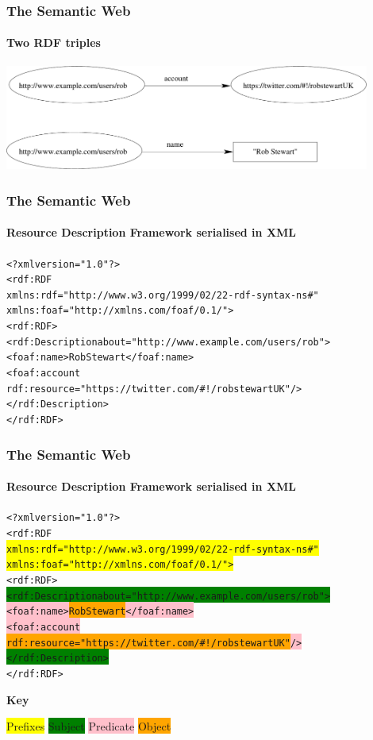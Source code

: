 \documentclass{beamer}
\newcommand{\hilightyellow}[1]{\colorbox{yellow}{#1}}
\newcommand{\hilightgreen}[1]{\colorbox{green}{#1}}
\newcommand{\hilightorange}[1]{\colorbox{orange}{#1}}
\newcommand{\hilightpink}[1]{\colorbox{pink}{#1}}
\begin{document}
\begin{frame}
\frametitle{The Semantic Web}
\framesubtitle{Two RDF triples}

\begin{center}
\includegraphics[width=120mm]{images/rdfexample.pdf}
\end{center}

\end{frame}




\begin{frame}[fragile]
\frametitle{The Semantic Web}
\framesubtitle{Resource Description Framework serialised in XML}

\small
\begin{alltt}
<?xml version="1.0"?>
<rdf:RDF
  xmlns:rdf="http://www.w3.org/1999/02/22-rdf-syntax-ns#"
  xmlns:foaf="http://xmlns.com/foaf/0.1/">
<rdf:RDF>
  <rdf:Description about="http://www.example.com/users/rob">
    <foaf:name>Rob Stewart</foaf:name>
    <foaf:account
       rdf:resource="https://twitter.com/#!/robstewartUK" />
  </rdf:Description>
</rdf:RDF>
\end{alltt}

\end{frame}

\begin{frame}[fragile]
\frametitle{The Semantic Web}
\framesubtitle{Resource Description Framework serialised in XML}

\small
\begin{alltt}
<?xml version="1.0"?>
<rdf:RDF
\hilightyellow{xmlns:rdf="http://www.w3.org/1999/02/22-rdf-syntax-ns#"}
\hilightyellow{xmlns:foaf="http://xmlns.com/foaf/0.1/">}
<rdf:RDF>
  \hilightgreen{<rdf:Description about="http://www.example.com/users/rob">}
    \hilightpink{<foaf:name>}\hilightorange{Rob Stewart}\hilightpink{</foaf:name>}
    \hilightpink{<foaf:account}
       \hilightorange{rdf:resource="https://twitter.com/#!/robstewartUK"}\hilightpink{/>}
  \hilightgreen{</rdf:Description>}
</rdf:RDF>
\end{alltt}

\bigskip
\textbf{Key}

\hilightyellow{Prefixes}
\hilightgreen{Subject}
\hilightpink{Predicate}
\hilightorange{Object}

\end{frame}
\end{document}
